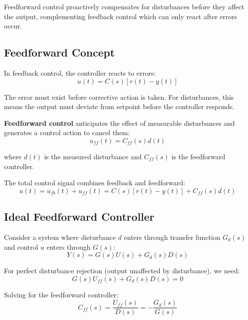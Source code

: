 Feedforward control proactively compensates for disturbances before they affect the output, complementing feedback control which can only react after errors occur.

\subsection{Feedforward Concept}
\label{subsec:ff_concept}

In feedback control, the controller reacts to errors:
\begin{equation}
u(t) = C(s)[r(t) - y(t)]
\end{equation}

The error must exist before corrective action is taken. For disturbances, this means the output must deviate from setpoint before the controller responds.

\textbf{Feedforward control} anticipates the effect of measurable disturbances and generates a control action to cancel them:
\begin{equation}
u_{ff}(t) = C_{ff}(s) d(t)
\end{equation}

where $d(t)$ is the measured disturbance and $C_{ff}(s)$ is the feedforward controller.

The total control signal combines feedback and feedforward:
\begin{equation}
u(t) = u_{fb}(t) + u_{ff}(t) = C(s)[r(t) - y(t)] + C_{ff}(s) d(t)
\end{equation}

\subsection{Ideal Feedforward Controller}
\label{subsec:ideal_ff}

Consider a system where disturbance $d$ enters through transfer function $G_d(s)$ and control $u$ enters through $G(s)$:
\begin{equation}
Y(s) = G(s) U(s) + G_d(s) D(s)
\end{equation}

For perfect disturbance rejection (output unaffected by disturbance), we need:
\begin{equation}
G(s) U_{ff}(s) + G_d(s) D(s) = 0
\end{equation}

Solving for the feedforward controller:
\begin{equation}
\boxed{C_{ff}(s) = \frac{U_{ff}(s)}{D(s)} = -\frac{G_d(s)}{G(s)}}
\label{eq:ideal_ff}
\end{equation}

